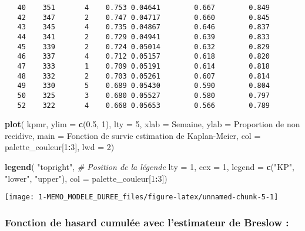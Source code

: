 \documentclass[
]{article}
\newenvironment{Shaded}{\begin{snugshade}}{\end{snugshade}}
\newcommand{\AttributeTok}[1]{\textcolor[rgb]{0.13,0.29,0.53}{#1}}
\newcommand{\CommentTok}[1]{\textcolor[rgb]{0.56,0.35,0.01}{\textit{#1}}}
\newcommand{\DecValTok}[1]{\textcolor[rgb]{0.00,0.00,0.81}{#1}}
\newcommand{\FloatTok}[1]{\textcolor[rgb]{0.00,0.00,0.81}{#1}}
\newcommand{\FunctionTok}[1]{\textcolor[rgb]{0.13,0.29,0.53}{\textbf{#1}}}
\newcommand{\NormalTok}[1]{#1}
\newcommand{\SpecialCharTok}[1]{\textcolor[rgb]{0.81,0.36,0.00}{\textbf{#1}}}
\newcommand{\StringTok}[1]{\textcolor[rgb]{0.31,0.60,0.02}{#1}}
\begin{document}
\begin{verbatim}
   40    351       4    0.753 0.04641        0.667        0.849
   42    347       2    0.747 0.04717        0.660        0.845
   43    345       4    0.735 0.04867        0.646        0.837
   44    341       2    0.729 0.04941        0.639        0.833
   45    339       2    0.724 0.05014        0.632        0.829
   46    337       4    0.712 0.05157        0.618        0.820
   47    333       1    0.709 0.05191        0.614        0.818
   48    332       2    0.703 0.05261        0.607        0.814
   49    330       5    0.689 0.05430        0.590        0.804
   50    325       3    0.680 0.05527        0.580        0.797
   52    322       4    0.668 0.05653        0.566        0.789
\end{verbatim}

\begin{Shaded}
\begin{Highlighting}[]
\FunctionTok{plot}\NormalTok{(}
\NormalTok{  kpmr,}
  \AttributeTok{ylim =} \FunctionTok{c}\NormalTok{(}\FloatTok{0.5}\NormalTok{, }\DecValTok{1}\NormalTok{),}
  \AttributeTok{lty =} \DecValTok{5}\NormalTok{,}
  \AttributeTok{xlab =} \StringTok{\textquotesingle{}Semaine\textquotesingle{}}\NormalTok{,}
  \AttributeTok{ylab =} \StringTok{\textquotesingle{}Proportion de non recidive\textquotesingle{}}\NormalTok{,}
  \AttributeTok{main =} \StringTok{\textquotesingle{}Fonction de survie estimation de Kaplan{-}Meier\textquotesingle{}}\NormalTok{,}
  \AttributeTok{col =}\NormalTok{ palette\_couleur[}\DecValTok{1}\SpecialCharTok{:}\DecValTok{3}\NormalTok{], }
  \AttributeTok{lwd =} \DecValTok{2}\NormalTok{)}

\FunctionTok{legend}\NormalTok{(}
  \StringTok{"topright"}\NormalTok{,  }\CommentTok{\# Position de la légende}
  \AttributeTok{lty =} \DecValTok{1}\NormalTok{,}
  \AttributeTok{cex =} \DecValTok{1}\NormalTok{,}
  \AttributeTok{legend =} \FunctionTok{c}\NormalTok{(}\StringTok{"KP"}\NormalTok{, }\StringTok{"lower"}\NormalTok{, }\StringTok{"upper"}\NormalTok{),}
  \AttributeTok{col =}\NormalTok{ palette\_couleur[}\DecValTok{1}\SpecialCharTok{:}\DecValTok{3}\NormalTok{])}
\end{Highlighting}
\end{Shaded}

\begin{center}\texttt{[image: 1-MEMO\_MODELE\_DUREE\_files/figure-latex/unnamed-chunk-5-1]} \end{center}

\hypertarget{fonction-de-hasard-cumuluxe9e-avec-lestimateur-de-breslow}{%
\subsubsection{Fonction de hasard cumulée avec l'estimateur de Breslow
:}\label{fonction-de-hasard-cumuluxe9e-avec-lestimateur-de-breslow}}
\end{document}

